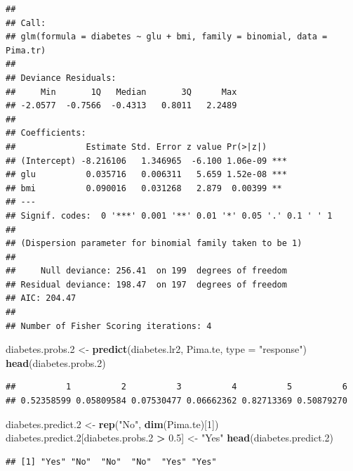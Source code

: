 \documentclass[]{article}
\newenvironment{Shaded}{\begin{snugshade}}{\end{snugshade}}
\newcommand{\KeywordTok}[1]{\textcolor[rgb]{0.13,0.29,0.53}{\textbf{#1}}}
\newcommand{\DataTypeTok}[1]{\textcolor[rgb]{0.13,0.29,0.53}{#1}}
\newcommand{\DecValTok}[1]{\textcolor[rgb]{0.00,0.00,0.81}{#1}}
\newcommand{\FloatTok}[1]{\textcolor[rgb]{0.00,0.00,0.81}{#1}}
\newcommand{\StringTok}[1]{\textcolor[rgb]{0.31,0.60,0.02}{#1}}
\newcommand{\OperatorTok}[1]{\textcolor[rgb]{0.81,0.36,0.00}{\textbf{#1}}}
\newcommand{\NormalTok}[1]{#1}
\begin{document}
\begin{verbatim}
## 
## Call:
## glm(formula = diabetes ~ glu + bmi, family = binomial, data = Pima.tr)
## 
## Deviance Residuals: 
##     Min       1Q   Median       3Q      Max  
## -2.0577  -0.7566  -0.4313   0.8011   2.2489  
## 
## Coefficients:
##              Estimate Std. Error z value Pr(>|z|)    
## (Intercept) -8.216106   1.346965  -6.100 1.06e-09 ***
## glu          0.035716   0.006311   5.659 1.52e-08 ***
## bmi          0.090016   0.031268   2.879  0.00399 ** 
## ---
## Signif. codes:  0 '***' 0.001 '**' 0.01 '*' 0.05 '.' 0.1 ' ' 1
## 
## (Dispersion parameter for binomial family taken to be 1)
## 
##     Null deviance: 256.41  on 199  degrees of freedom
## Residual deviance: 198.47  on 197  degrees of freedom
## AIC: 204.47
## 
## Number of Fisher Scoring iterations: 4
\end{verbatim}

\begin{Shaded}
\begin{Highlighting}[]
\NormalTok{diabetes.probs.}\DecValTok{2}\NormalTok{ <-}\StringTok{ }\KeywordTok{predict}\NormalTok{(diabetes.lr2, Pima.te, }\DataTypeTok{type =} \StringTok{"response"}\NormalTok{)}
\KeywordTok{head}\NormalTok{(diabetes.probs.}\DecValTok{2}\NormalTok{)}
\end{Highlighting}
\end{Shaded}

\begin{verbatim}
##          1          2          3          4          5          6 
## 0.52358599 0.05809584 0.07530477 0.06662362 0.82713369 0.50879270
\end{verbatim}

\begin{Shaded}
\begin{Highlighting}[]
\NormalTok{diabetes.predict.}\DecValTok{2}\NormalTok{ <-}\StringTok{ }\KeywordTok{rep}\NormalTok{(}\StringTok{"No"}\NormalTok{, }\KeywordTok{dim}\NormalTok{(Pima.te)[}\DecValTok{1}\NormalTok{])}
\NormalTok{diabetes.predict.}\DecValTok{2}\NormalTok{[diabetes.probs.}\DecValTok{2} \OperatorTok{>}\StringTok{ }\FloatTok{0.5}\NormalTok{] <-}\StringTok{ "Yes"}
\KeywordTok{head}\NormalTok{(diabetes.predict.}\DecValTok{2}\NormalTok{)}
\end{Highlighting}
\end{Shaded}

\begin{verbatim}
## [1] "Yes" "No"  "No"  "No"  "Yes" "Yes"
\end{verbatim}
\end{document}
